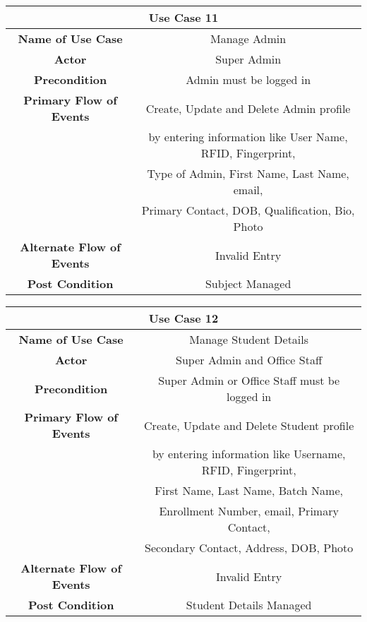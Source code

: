 \vspace{1cm}
\begin{center}
    \begin{tabular}{|c|c|}
        \hline
        \multicolumn{2}{|c|}{Use Case 11} \\
        \hline
        \textbf{Name of Use Case} & Manage Admin \\
        \hline
        \textbf{Actor} & Super Admin \\
        \hline
        \textbf{Precondition} & Admin must be logged in \\
        \hline
        \textbf{Primary Flow of Events} & Create, Update and Delete Admin profile\\
        & by entering information like User Name, RFID, Fingerprint, \\
        & Type of Admin, First Name, Last Name, email, \\
        & Primary Contact, DOB, Qualification, Bio, Photo \\
        \hline
        \textbf{Alternate Flow of Events} & Invalid Entry \\
        \hline
        \textbf{Post Condition} & Subject Managed \\
        \hline
    \end{tabular}
\end{center}

\vspace{1cm}
\begin{center}
    \begin{tabular}{|c|c|}
        \hline
        \multicolumn{2}{|c|}{Use Case 12} \\
        \hline
        \textbf{Name of Use Case} & Manage Student Details \\
        \hline
        \textbf{Actor} & Super Admin and Office Staff \\
        \hline
        \textbf{Precondition} & Super Admin or Office Staff must be logged in \\
        \hline
        \textbf{Primary Flow of Events} & Create, Update and Delete Student profile \\
        & by entering information like Username, RFID, Fingerprint, \\
        & First Name, Last Name, Batch Name, \\
        & Enrollment Number, email, Primary Contact, \\
        & Secondary Contact, Address, DOB, Photo \\
        \hline
        \textbf{Alternate Flow of Events} & Invalid Entry \\
        \hline
        \textbf{Post Condition} & Student Details Managed \\
        \hline
    \end{tabular}
\end{center}

